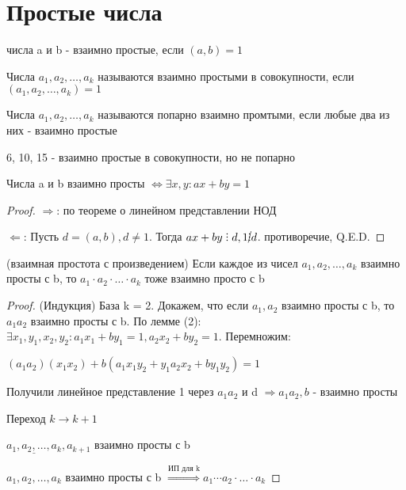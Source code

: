 \section{Простые числа}

\begin{definition}
  числа a и b - взаимно простые, если $(a, b) = 1$
\end{definition}

\begin{definition}
  Числа $a_1, a_2, \ldots, a_k$ называются взаимно простыми в совокупности, если $(a_1, a_2, \ldots, a_k) = 1$
\end{definition}

\begin{definition}
  Числа $a_1, a_2, \ldots, a_k$ называются попарно взаимно промтыми, если любые два из них - взаимно простые
\end{definition}

\begin{eg}
  6, 10, 15 - взаимно простые в совокупности, но не попарно
\end{eg}

\begin{lemma}
  Числа a и b взаимно просты $\Leftrightarrow \exists x, y: ax + by = 1$
\end{lemma}

\begin{proof}
  $\Rightarrow$: по теореме о линейном представлении НОД

  $\Leftarrow$: Пусть $d = (a, b), d \neq 1$. Тогда $ax + by \divby d, 1 \cancel{\divby} d$. противоречие, Q.E.D.
\end{proof}

\begin{property} (взаимная простота с произведением)
  Если каждое из чисел $a_1, a_2, \ldots, a_k$ взаимно просты с b, то $a_1 \cdot a_2 \cdot \ldots \cdot a_k$ тоже взаимно просто с b
\end{property}

\begin{proof} (Индукция)
  База k = 2. Докажем, что если $a_1, a_2$ взаимно просты с b, то $a_1a_2$ взаимно просты с b.
  По лемме (2): $\exists x_1, y_1, x_2, y_2: a_1x_1 + by_1 = 1, a_2x_2 + by_2 = 1$. Перемножим:
  
  
  $(a_1a_2)(x_1x_2) + b(a_1x_1y_2 + y_1a_2x_2 + by_1y_2) = 1$

  Получили линейное представление 1 через $a_1a_2$ и d $\Rightarrow a_1a_2, b$  - взаимно просты

  Переход $k \to k + 1$

  $\underline{a_1, a_2, \ldots, a_k}, a_{k+1}$ взаимно просты с b

  $a_1, a_2, \ldots, a_k$ взаимно просты с b $\overset{\text{ИП для k}}{\Rightarrow} a_1 \cdots a_2 \cdot \ldots \cdot a_k$
\end{proof}

